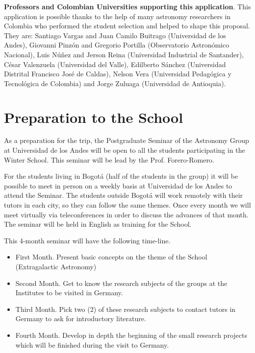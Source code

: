 \documentclass[12pt]{article}
\begin{document}
{\bf Professors and Colombian Universities supporting this application}. This application is
possible thanks to the help of many astronomy researchers in
Colombia who performed the student selection and helped to shape this
proposal. They are: Santiago Vargas and Juan Camilo Buitrago
(Universidad de los Andes), Giovanni Pinz\'on and Gregorio
Portilla (Observatorio Astron\'omico Nacional), Luis N\'u\~nez and
Jerson Reina (Universidad Industrial de Santander), C\'esar Valenzuela
(Universidad del Valle), Edilberto S\'anchez (Universidad Distrital
Francisco Jos\'e de Caldas), Nelson Vera (Universidad Pedag\'ogica y Tecnol\'ogica de
Colombia) and Jorge Zuluaga (Universidad de Antioquia). 


\section{Preparation to the School}
\label{sec:preparation}

As a preparation for the trip, the Postgraduate Seminar of the Astronomy
Group at Universidad de los Andes will be open to all the students participating in the
Winter School. This seminar will be lead by the Prof. Forero-Romero. 

For the students living in Bogot\'a (half of the students in the group)
it will be possible to meet in person on a weekly basis at Universidad
de los Andes to attend the Seminar. The students outside Bogot\'a
will work remotely with their tutors in each city, so they can follow the same
themes. Once every month we will meet virtually via teleconferences in
order to discuss the advances of that month. The seminar
will be held in English as training for the School. 

This 4-month seminar will have the following time-line.
\begin{itemize}
\item First Month. Present basic concepts on the theme of the School
  (Extragalactic Astronomy)
\item Second Month. Get to know the research subjects of the groups at
  the Institutes to be visited in Germany.
\item Third Month. Pick two (2) of these research subjects to contact
  tutors in Germany to ask for introductory literature.
\item Fourth Month. Develop in depth the beginning of the small
  research projects which will be finished during the visit to Germany. 
\end{itemize}
\end{document}
